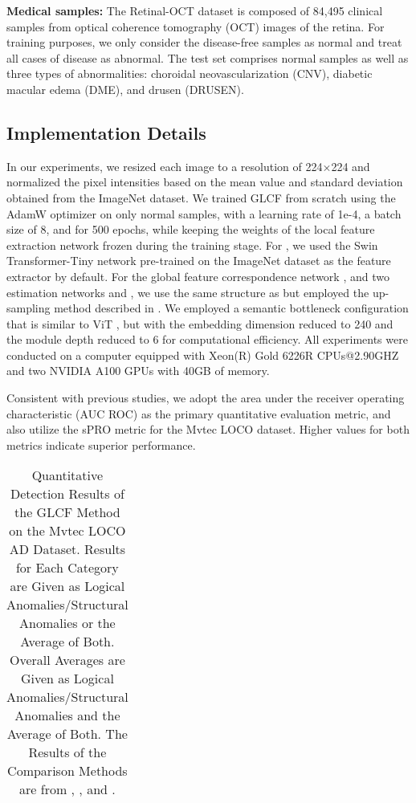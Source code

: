 \documentclass[lettersize,journal]{IEEEtran}
\begin{document}
\textbf{Medical samples:} The Retinal-OCT dataset\cite{r32} is composed of 84,495 clinical samples from optical coherence tomography (OCT) images of the retina. For training purposes, we only consider the disease-free samples as normal and treat all cases of disease as abnormal. The test set comprises normal samples as well as three types of abnormalities: choroidal neovascularization (CNV), diabetic macular edema (DME), and drusen (DRUSEN).

\subsection{Implementation Details}

In our experiments, we resized each image to a resolution of 224×224 and normalized the pixel intensities based on the mean value and standard deviation obtained from the ImageNet dataset. We trained GLCF from scratch using the AdamW optimizer on only normal samples, with a learning rate of 1e-4, a batch size of 8, and for 500 epochs, while keeping the weights of the local feature extraction network  frozen during the training stage. For , we used the Swin Transformer-Tiny network \cite{r30} pre-trained on the ImageNet dataset as the feature extractor by default. For the global feature correspondence network , and two estimation networks  and , we use the same structure as  but employed the up-sampling method described in \cite{r33}. We employed a semantic bottleneck configuration that is similar to ViT \cite{r29}, but with the embedding dimension reduced to 240 and the module depth reduced to 6 for computational efficiency. All experiments were conducted on a computer equipped with Xeon(R) Gold 6226R CPUs@2.90GHZ and two NVIDIA A100 GPUs with 40GB of memory.

Consistent with previous studies, we adopt the area under the receiver operating characteristic (AUC ROC) as the primary quantitative evaluation metric, and also utilize the sPRO\cite{r31} metric for the Mvtec LOCO dataset. Higher values for both metrics indicate superior performance.
\begin{table*}
\caption{Quantitative Detection Results of the GLCF Method on the Mvtec LOCO AD Dataset. Results for Each Category are Given as Logical Anomalies/Structural Anomalies or the Average of Both. Overall Averages are Given as Logical Anomalies/Structural Anomalies and the Average of Both. The Results of the Comparison Methods are from \cite{r31}, \cite{r39}, and \cite{r40}.}
\label{table}
\setlength{\tabcolsep}{3pt}
\begin{threeparttable}
\begin{tabular}{p{\textwidth}}

\end{tabular}
\end{threeparttable}
\label{table4}
\end{table*}
\end{document}
